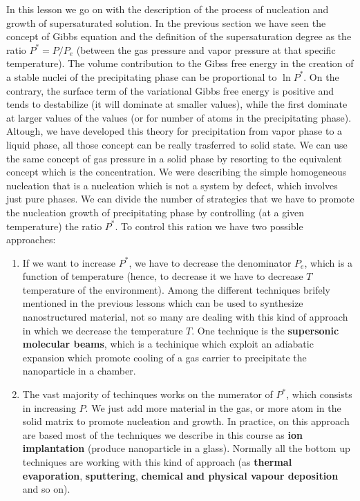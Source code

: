 \documentclass[../main/main.tex]{subfiles}
\begin{document}
In this lesson we go on with the description of the process of nucleation and growth of supersaturated solution. In the previous section we have seen the concept of Gibbs equation and the definition of the supersaturation degree as the ratio \( P^*=P/P_e \) (between the gas pressure and vapor pressure at that specific temperature). The volume contribution to the Gibss free energy in the creation of a stable nuclei of the precipitating phase can be proportional to \( \ln{P^*}  \). On the contrary, the surface term of the variational Gibbs free energy is positive and tends to destabilize (it will dominate at smaller values), while the first dominate at larger values of the values (or for number of atoms in the precipitating phase).
Altough, we have developed this theory for precipitation from vapor phase to a liquid phase, all those concept can be really trasferred to solid state. We can use the same concept of gas pressure in a solid phase by resorting to the equivalent concept which is the concentration. We were describing the simple homogeneous nucleation that is a nucleation which is not a system by defect, which involves just pure phases. We can divide the number of strategies that we have to promote the nucleation growth of precipitating phase by controlling (at a given temperature) the ratio \( P^* \). To control this ration we have two possible approaches:
\begin{enumerate}
\item If we want to increase \( P^* \), we have to decrease the denominator \( P_e \), which is a function of temperature (hence, to decrease it we have to decrease \( T \) temperature of the environment). Among the different techniques brifely mentioned in the previous lessons which can be used to synthesize nanostructured material, not so many are dealing with this kind of approach in which we decrease the temperature \( T \). One technique is the \textbf{supersonic molecular beams}, which is a techinique which exploit an adiabatic expansion which promote cooling of a gas carrier to precipitate the nanoparticle in a chamber.

\item The vast majority of techinques works on the numerator of \( P^* \), which consists in increasing \( P \).
We just add more material in the gas, or more atom in the solid matrix to promote nucleation and growth. In practice, on this approach are based most of the techniques we describe in this course as \textbf{ion implantation} (produce nanoparticle in a glass). Normally all the bottom up techniques are working with this kind of approach (as \textbf{thermal evaporation}, \textbf{sputtering}, \textbf{chemical and physical vapour deposition} and so on).

\end{enumerate}
\end{document}
